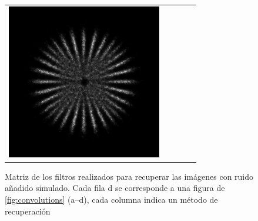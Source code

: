 \documentclass{./packages/optica-article}
\begin{document}
\begin{figure}[hbp]
\begin{tabular}[t]{l c c c c}
		\includegraphics[scale=0.25]{Simulation deconvolution/ref_np_0.01/RL_50.png}
		\\
	\end{tabular}
	\caption{Matriz de los filtros realizados para recuperar las imágenes con ruido añadido simulado. Cada fila d se corresponde a una figura de \ref{fig:convolutions} (a--d), cada columna indica un método de recuperación}
\end{figure}



\end{document}

